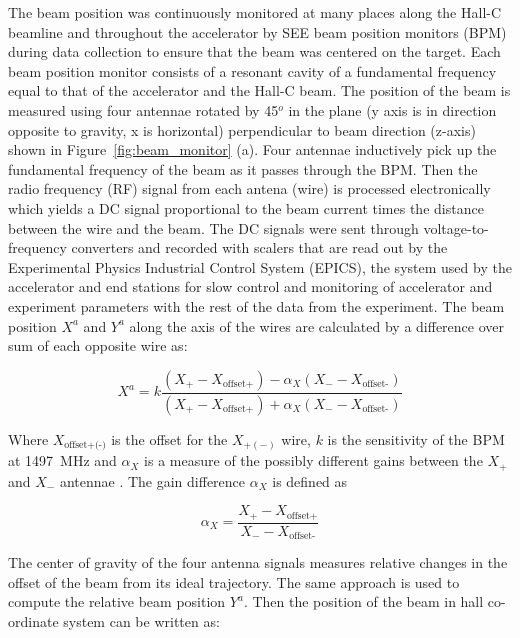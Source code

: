 The beam position was continuously monitored at many places along the Hall-C beamline and throughout the accelerator by SEE beam position monitors (BPM) during data collection to ensure that the beam was centered on the target. Each beam position monitor consists of a resonant cavity of a fundamental frequency equal to that of the accelerator and the Hall-C beam. The position of the beam is measured using four antennae rotated by 45$^o$ in the plane (y axis is in direction opposite to gravity, x is horizontal) perpendicular to beam direction (z-axis) shown in Figure~\ref{fig:beam_monitor} (a).
Four antennae inductively pick up the fundamental frequency of the beam as it passes through the BPM. Then the radio frequency (RF) signal from each antena (wire) is processed electronically which yields a DC signal proportional to the beam current times the distance between the wire and the beam. The DC signals were sent through voltage-to-frequency converters and recorded with scalers that are read out by the Experimental Physics Industrial Control System (EPICS), the system used by the accelerator and end stations for slow control and monitoring of accelerator and experiment parameters with the rest of the data from the experiment. The beam position $X^a$ and $Y^a$ along the axis of the wires are calculated by a difference over sum of each opposite wire as:

\begin{equation} \label{equ:bpm1}
X^{a} = k \frac{\left(X_{+} - X_{\textrm{offset+}}\right) - \alpha_{X}\left(X_{-} - X_{\textrm{offset-}}\right)}{\left(X_{+} - X_{\textrm{offset+}}\right) + \alpha_{X}\left(X_{-} - X_{\textrm{offset-}}\right)}
\end{equation}

Where $X_{\textrm{offset+(-)}}$ is the offset for the $X_{+(-)}$ wire, $k$ is the sensitivity of the BPM at 1497~MHz and $\alpha_{X}$ is a measure of the possibly different gains between the $X_{+}$ and $X_{-}$ antennae \cite{sarah_G0,bpm1}. The gain difference $\alpha_X$ is defined as

\begin{equation} \label{equ:bpm2}
\alpha_{X} = \frac{X_{+} - X_{\textrm{offset+}}}{X_- - X_{\textrm{offset-}}}
\end{equation}

The center of gravity of the four antenna signals measures relative changes in the offset of the beam from its ideal trajectory. The same approach is used to compute the relative beam position $Y^a$. Then the position of the beam in hall co-ordinate system can be written as:


